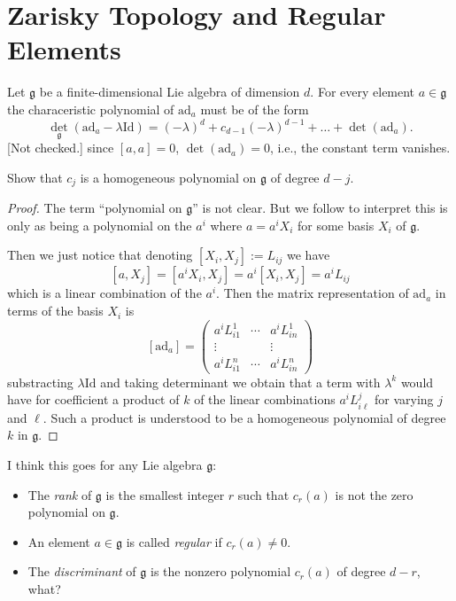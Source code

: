 \section{Zarisky Topology and Regular
Elements}
\label{section-zaris-topol-regul-eleme}

Let $\mathfrak{g}$ be a finite-dimensional
Lie algebra
of dimension $d$. For every element  $a \in
\mathfrak{g}$
the characeristic polynomial
of $\text{ad}_a$ must be of the form
$$
\det_{\mathfrak{g}}(\text{ad}_a-
\lambda\text{Id})
=(-\lambda)^d+c_{d-1}(-\lambda)^{d-1}+\ldots
+\det(\text{ad}_a).
$$
[Not checked.]
since $[a,a]=0$, $\det(\text{ad}_a)=0$, i.e.,
the
constant term vanishes.

\begin{exercise}
\label{exercise-chara-polyn-ada}
Show that $c_j$ is a homogeneous polynomial
on $\mathfrak{g}$
of degree $d-j$.
\end{exercise}

\begin{proof}
The term ``polynomial on $\mathfrak{g}$'' is
not clear.
But we follow \cite{KLAL} to interpret this
is only as
being a polynomial on the $a^i$ where
$a=a^iX_i$
for some basis $X_i$ of $\mathfrak{g}$.

Then we just notice that denoting
$[X_i,X_j]:=L_{ij}$ we have
$$
[a,X_j]=[a^iX_i,X_j]=a^i[X_i,X_j]=a^iL_{ij}
$$
which is a linear combination of the $a^i$.
Then the matrix
representation of $\text{ad}_a$ in terms of
the basis $X_i$ is
$$
[\text{ad}_a]=\begin{pmatrix}
a^iL_{i1}^1&\cdots &a^iL_{in}^1\\
\vdots &&\vdots \\
a^iL_{i 1}^n&  \cdots &  a^iL_{in}^n
\end{pmatrix}
$$
substracting $\lambda \text{Id}$ and taking
determinant
we obtain that a term with $\lambda^k$ would
have
for coefficient a product of $k$ of the
linear
combinations $a^iL_{i\ell}^j$ for varying $j$
and $\ell$.
Such a product is understood to be a
homogeneous polynomial
of degree $k$ in $\mathfrak{g}$.
\end{proof}

\begin{definition}
\label{definition-rank}
I think this goes for any Lie algebra
$\mathfrak{g}$:
\begin{itemize}
\item The {\it rank} of $\mathfrak{g}$ is
the smallest integer $r$ such that $c_r(a)$
is not the
zero polynomial on $\mathfrak{g}$.
\item An element $a \in \mathfrak{g}$ is
called {\it regular}
if $c_r(a)\neq 0$.
\item The {\it discriminant} of
$\mathfrak{g}$ is
the nonzero polynomial $c_r(a)$ of degree
$d-r$, what?
\end{itemize}
\end{definition}

